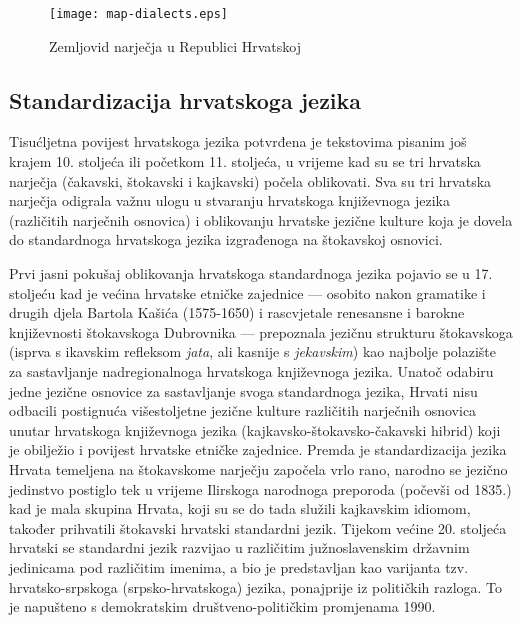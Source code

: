 \begin{multicols}{2}
\begin{figure}[htb]
  \center
  \texttt{[image: map-dialects.eps]}
  \caption{Zemljovid narječja u Republici Hrvatskoj}
  \label{fig:zemljovid}
\end{figure}

\subsection{Standardizacija hrvatskoga jezika}

Tisućljetna povijest hrvatskoga jezika potvrđena je tekstovima pisanim još krajem 10. stoljeća ili početkom 11. stoljeća, u vrijeme kad su se tri hrvatska narječja (čakavski, štokavski i kajkavski) počela oblikovati. Sva su tri hrvatska narječja odigrala važnu ulogu u stvaranju hrvatskoga književnoga jezika (različitih narječnih osnovica) i oblikovanju hrvatske jezične kulture koja je dovela do standardnoga hrvatskoga jezika izgrađenoga na štokavskoj osnovici.


Prvi jasni pokušaj oblikovanja hrvatskoga standardnoga jezika pojavio se u 17. stoljeću kad je većina hrvatske etničke zajednice — osobito nakon gramatike i drugih djela Bartola Kašića (1575-1650) i rascvjetale renesansne i barokne književnosti štokavskoga Dubrovnika — prepoznala jezičnu strukturu štokavskoga (isprva s ikavskim refleksom \emph{jata}, ali kasnije s \emph{jekavskim}) kao najbolje polazište za sastavljanje nadregionalnoga hrvatskoga književnoga jezika. Unatoč odabiru jedne jezične osnovice za sastavljanje svoga standardnoga jezika, Hrvati nisu odbacili postignuća višestoljetne jezične kulture različitih narječnih osnovica unutar hrvatskoga književnoga jezika (kajkavsko-štokavsko-čakavski hibrid) koji je obilježio i povijest hrvatske etničke zajednice. Premda je standardizacija jezika Hrvata temeljena na štokavskome narječju započela vrlo rano, narodno se jezično jedinstvo postiglo tek u vrijeme Ilirskoga narodnoga preporoda (počevši od 1835.) kad je mala skupina Hrvata, koji su se do tada služili kajkavskim idiomom, također prihvatili štokavski hrvatski standardni jezik. Tijekom većine 20. stoljeća hrvatski se standardni jezik razvijao u različitim južnoslavenskim državnim jedinicama pod različitim imenima, a bio je predstavljan kao varijanta tzv. hrvatsko-srpskoga (srpsko-hrvatskoga) jezika, ponajprije iz političkih razloga. To je napušteno s demokratskim društveno-političkim promjenama 1990.


\end{multicols}
